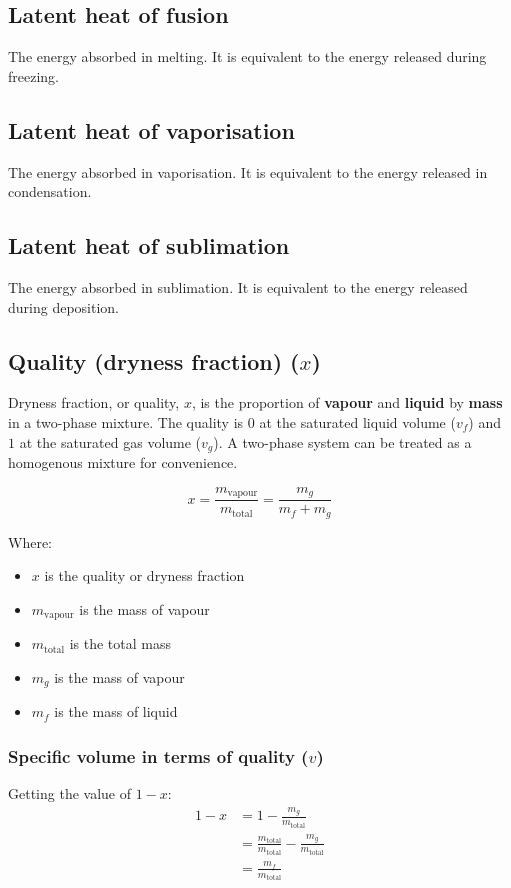 \documentclass[11pt]{article}
\begin{document}
\subsection{Latent heat of fusion}
\label{sec:org8b8b638}
The energy absorbed in melting. It is equivalent to the energy released during freezing.

\subsection{Latent heat of vaporisation}
\label{sec:orgb9566d3}
The energy absorbed in vaporisation. It is equivalent to the energy released in condensation.

\subsection{Latent heat of sublimation}
\label{sec:org81ec207}
The energy absorbed in sublimation. It is equivalent to the energy released during deposition.

\subsection{Quality (dryness fraction) (\(x\))}
\label{sec:orgcb48635}
Dryness fraction, or quality, \(x\), is the proportion of \textbf{vapour} and \textbf{liquid} by \textbf{mass} in a two-phase mixture. The quality is \(0\) at the saturated liquid volume (\(v_f\)) and \(1\) at the saturated gas volume (\(v_g\)). A two-phase system can be treated as a homogenous mixture for convenience.

\[x = \frac{m_{\text{vapour}}}{m_{\text{total}}} = \frac{m_g}{m_f + m_g}\]

Where:
\begin{itemize}
\item \(x\) is the quality or dryness fraction
\item \(m_{\text{vapour}}\) is the mass of vapour
\item \(m_{\text{total}}\) is the total mass
\item \(m_g\) is the mass of vapour
\item \(m_f\) is the mass of liquid
\end{itemize}

\newpage

\subsubsection{Specific volume in terms of quality (\(v\))}
\label{sec:orgbf5a49f}
Getting the value of \(1 - x\):
\begin{align*}
1 - x &= 1 - \frac{m_g}{m_{\text{total}}} \\
&= \frac{m_{\text{total}}}{m_{\text{total}}} - \frac{m_g}{m_{\text{total}}} \\
&= \frac{m_f}{m_{\text{total}}}
\end{align*}
\end{document}
